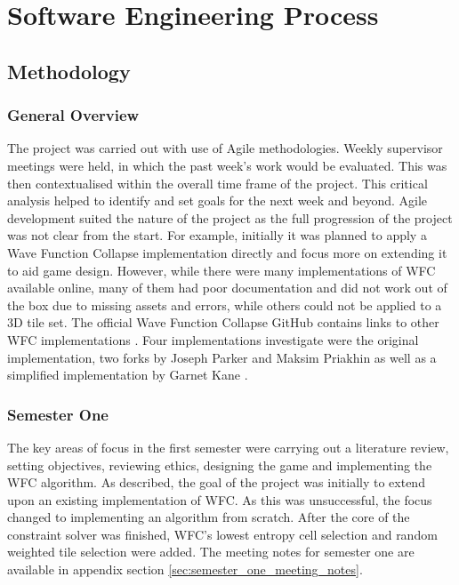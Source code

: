 \chapter{Software Engineering Process}
\section{Methodology}
\subsection{General Overview}
The project was carried out with use of Agile methodologies. Weekly supervisor meetings were held, in which the past week's work would be evaluated. This was then contextualised within the overall time frame of the project. This critical analysis helped to identify and set goals for the next week and beyond. Agile development suited the nature of the project as the full progression of the project was not clear from the start. For example, initially it was planned to apply a Wave Function Collapse implementation directly and focus more on extending it to aid game design. However, while there were many implementations of WFC available online, many of them had poor documentation and did not work out of the box due to missing assets and errors, while others could not be applied to a 3D tile set. The official Wave Function Collapse GitHub contains links to other WFC implementations \cite{Gumin_Wave_Function_Collapse_2016}. Four implementations investigate were the original implementation, two forks by Joseph Parker \cite{unity-WFC} and Maksim Priakhin \cite{unity-WFC-3D} as well as a simplified implementation by Garnet Kane \cite{Easy_WFC}.

\subsection{Semester One}
The key areas of focus in the first semester were carrying out a literature review, setting objectives, reviewing ethics, designing the game and implementing the WFC algorithm. As described, the goal of the project was initially to extend upon an existing implementation of WFC. As this was unsuccessful, the focus changed to implementing an algorithm from scratch. After the core of the constraint solver was finished, WFC's lowest entropy cell selection and random weighted tile selection were added. The meeting notes for semester one are available in appendix section \ref{sec:semester_one_meeting_notes}.

